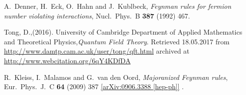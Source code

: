 \begin{thebibliography}{56}
A.~Denner, H.~Eck, O.~Hahn and J.~Kublbeck,
\textit{Feynman rules for fermion number violating interactions},
Nucl.\ Phys.\ B {\textbf{387}} (1992) 467.

Tong, D.,(2016). University of Cambridge Department of Applied Mathematics and Theoretical Physics,\textit{Quantum Field Theory}.  Retrieved
18.05.2017 from \href{http://www.damtp.cam.ac.uk/user/tong/qft.html}{http://www.damtp.cam.ac.uk/user/tong/qft.html} archived at
\href{http://www.webcitation.org/6qY4KDfDA}{http://www.webcitation.org/6qY4KDfDA}












R.~Kleiss, I.~Malamos and G.~van den Oord,
\textit{Majoranized Feynman rules},
Eur.\ Phys.\ J.\ C {\textbf{64}} (2009) 387
\href{https://arxiv.org/abs/0906.3388v2}{[arXiv:0906.3388 [hep-ph]]}
.


\end{thebibliography}
